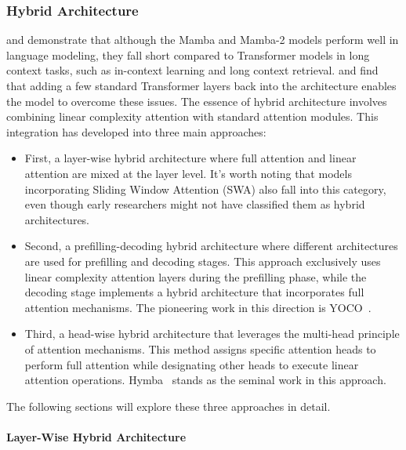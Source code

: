 \documentclass[11pt, a4paper, logo, copyright, nonumbering]{map}
\begin{document}
\subsubsection{Hybrid Architecture}
\label{ssec:hybrid_arch}
\citet{waleffe2024empirical} and \citet{parkcan} demonstrate that although the Mamba and Mamba-2 models perform well in language modeling, 
they fall short compared to Transformer models in long context tasks, such as in-context learning and long context retrieval.
\cite{chen2024stuffed} and \cite{waleffe2024empirical} find that adding a few standard Transformer layers back into the architecture enables the model to overcome these issues. 
The essence of hybrid architecture involves combining linear complexity attention with standard attention modules. This integration has developed into three main approaches: 
\begin{itemize}
    \item First, a layer-wise hybrid architecture where full attention and linear attention are mixed at the layer level. 
It's worth noting that models incorporating Sliding Window Attention (SWA) also fall into this category, even though early researchers might not have classified them as hybrid architectures. 
\item Second, a
prefilling-decoding hybrid architecture where different architectures are used for prefilling and decoding stages. This approach exclusively uses linear complexity attention layers during the prefilling phase, while the decoding stage implements a hybrid architecture that incorporates full attention mechanisms. The pioneering work in this direction is YOCO~\cite{sun2025you}.
\item Third, a head-wise hybrid architecture that leverages the multi-head principle of attention mechanisms. This method assigns specific attention heads to perform full attention while designating other heads to execute linear attention operations. Hymba~\cite{dong2024hymba} stands as the seminal work in this approach.

\end{itemize}


The following sections will explore these three approaches in detail.

\paragraph{Layer-Wise Hybrid Architecture}
\end{document}
